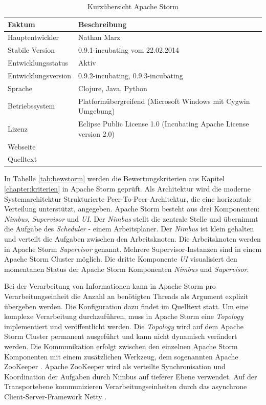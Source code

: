 \begin{table}[htbp]
	\centering
		\begin{tabular}{@{}ll@{}} \toprule
			\textbf{Faktum} & \textbf{Beschreibung} \\ \midrule
			Hauptentwickler & Nathan Marz \\
			Stabile Version & 0.9.1-incubating vom 22.02.2014 \\ 
			Entwicklungsstatus &  Aktiv \\
			Entwicklungsversion & 0.9.2-incubating, 0.9.3-incubating \\
			Sprache & Clojure, Java, Python \\
			Betriebssystem & Platformübergreifend (Microsoft Windows mit Cygwin Umgebung) \\
			Lizenz & Eclipse Public License 1.0 (Incubating Apache License version 2.0) \\
			Webseite &  \citeint{storm:home} \\
			Quelltext & \citeint{storm:GitHubApacheMirror} \\			
			\bottomrule			
		\end{tabular}
	\caption{Kurzübersicht Apache Storm}
	\label{tab:vorstorm}
\end{table}

In Tabelle \ref{tab:bewstorm} werden die Bewertungskriterien aus Kapitel \ref{chapter:kriterien} in Apache Storm geprüft. Als Architektur wird die moderne Systemarchitektur Strukturierte Peer-To-Peer-Architektur, die eine horizontale Verteilung unterstützt, angegeben. Apache Storm besteht aus drei Komponenten: \textit{Nimbus}, \textit{Supervisor} und \textit{UI}. Der \textit{Nimbus} stellt die zentrale Stelle und übernimmt die Aufgabe des \textit{Scheduler} - einem Arbeitsplaner. Der \textit{Nimbus} ist klein gehalten und verteilt die Aufgaben zwischen den Arbeitsknoten. Die Arbeitsknoten werden in Apache Storm \textit{Supervisor} genannt. Mehrere Supervisor-Instanzen sind in einem Apache Storm Cluster möglich. Die dritte Komponente \textit{UI} visualisiert den momentanen Status der Apache Storm Komponenten \textit{Nimbus} und \textit{Supervisor}. 

Bei der Verarbeitung von Informationen kann in Apache Storm pro Verarbeitungseinheit die Anzahl an benötigten Threads als Argument explizit übergeben werden. Die Konfiguration dazu findet im Quelltext statt. Um eine komplexe Verarbeitung durchzuführen, muss in Apache Storm eine \textit{Topology} implementiert und veröffentlicht werden. Die \textit{Topology} wird auf dem Apache Storm Cluster permanent ausgeführt und kann nicht dynamisch verändert werden. Die Kommunikation erfolgt zwischen den einzelnen Apache Storm Komponenten mit einem zusätzlichen Werkzeug, dem sogenannten Apache ZooKeeper . Apache ZooKeeper wird als verteilte Synchronisation und Koordination der Aufgaben durch Nimbus auf tieferer Ebene verwendet. Auf der Transportebene kommunizieren Verarbeitungseinheiten durch das asynchrone Client-Server-Framework Netty .

